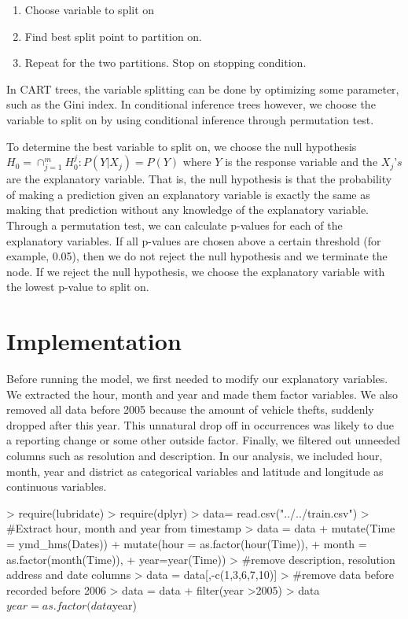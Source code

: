 \documentclass[11pt]{article}
\begin{document}
\begin{enumerate}
\item Choose variable to split on
\item Find best split point to partition on.
\item Repeat for the two partitions. Stop on stopping condition. 
\end{enumerate}

In CART trees, the variable splitting can be done by optimizing some parameter, such as the Gini index. In conditional inference trees however, we choose the variable to split on by using conditional inference through permutation test.

To determine the best variable to split on, we choose the null hypothesis  $H_0 = \cap_{j=1}^{m}  H_0^j : P(Y|X_j) = P(Y)$ where $Y$ is the response variable and the $X_j’s$ are the explanatory variable. That is, the null hypothesis is that the probability of making a prediction given an explanatory variable is exactly the same as making that prediction without any knowledge of the explanatory variable.  Through a permutation test, we can calculate p-values for each of the explanatory variables. If all p-values are chosen above a certain threshold (for example, 0.05), then we do not reject the null hypothesis and we terminate the node.  If  we reject the null hypothesis, we choose the explanatory variable with the lowest p-value to split on. 
 

 
\section*{Implementation}

Before running the model, we first needed to modify  our explanatory variables. We extracted the hour, month and year and made them factor variables. We also removed all data before 2005 because the amount of vehicle thefts, suddenly dropped after this year. This unnatural drop off in occurrences was likely to due a reporting change or some other outside factor.  Finally, we filtered out unneeded columns such as resolution and description. In our analysis, we included hour, month, year and district as categorical variables and latitude and longitude as continuous variables. 

\begin{Schunk}
\begin{Sinput}
> require(lubridate)
> require(dplyr)
> data= read.csv("../../train.csv")
> #Extract  hour, month and year from timestamp
> data = data %>% 
+   mutate(Time = ymd_hms(Dates)) %>%
+   mutate(hour = as.factor(hour(Time)), 
+          month = as.factor(month(Time)), 
+          year=year(Time))
> #remove description, resolution address and date columns
> data = data[,-c(1,3,6,7,10)]
> #remove data before recorded before 2006
> data = data %>%
+   filter(year >2005)
> data$year = as.factor(data$year)
\end{Sinput}
\end{Schunk}
\end{document}

